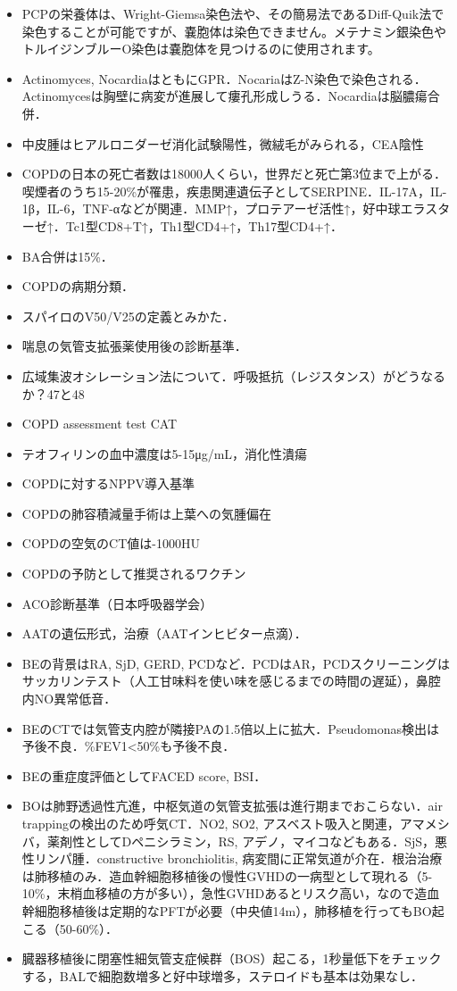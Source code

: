 \begin{itemize}
\item PCPの栄養体は、Wright-Giemsa染色法や、その簡易法であるDiff-Quik法で染色することが可能ですが、嚢胞体は染色できません。メテナミン銀染色やトルイジンブルーO染色は嚢胞体を見つけるのに使用されます。

\item Actinomyces, NocardiaはともにGPR．NocariaはZ-N染色で染色される．Actinomycesは胸壁に病変が進展して瘻孔形成しうる．Nocardiaは脳膿瘍合併．


\item 中皮腫はヒアルロニダーゼ消化試験陽性，微絨毛がみられる，CEA陰性

\item COPDの日本の死亡者数は18000人くらい，世界だと死亡第3位まで上がる．喫煙者のうち15-20\%が罹患，疾患関連遺伝子としてSERPINE．IL-17A，IL-1β，IL-6，TNF-αなどが関連．MMP↑，プロテアーゼ活性↑，好中球エラスターゼ↑．Tc1型CD8+T↑，Th1型CD4+↑，Th17型CD4+↑．
\item BA合併は15\%．
\item COPDの病期分類．
\item スパイロのV50/V25の定義とみかた．
\item 喘息の気管支拡張薬使用後の診断基準．
\item 広域集波オシレーション法について．呼吸抵抗（レジスタンス）がどうなるか？47と48
\item COPD assessment test CAT
\item テオフィリンの血中濃度は5-15μg/mL，消化性潰瘍
\item COPDに対するNPPV導入基準
\item COPDの肺容積減量手術は上葉への気腫偏在
\item COPDの空気のCT値は-1000HU
\item COPDの予防として推奨されるワクチン
\item ACO診断基準（日本呼吸器学会）
\item AATの遺伝形式，治療（AATインヒビター点滴）．
\item BEの背景はRA, SjD, GERD, PCDなど．PCDはAR，PCDスクリーニングはサッカリンテスト（人工甘味料を使い味を感じるまでの時間の遅延），鼻腔内NO異常低音．
\item BEのCTでは気管支内腔が隣接PAの1.5倍以上に拡大．Pseudomonas検出は予後不良．\%FEV1<50\%も予後不良．
\item BEの重症度評価としてFACED score, BSI．
\item BOは肺野透過性亢進，中枢気道の気管支拡張は進行期までおこらない．air trappingの検出のため呼気CT．NO2, SO2, アスベスト吸入と関連，アマメシバ，薬剤性としてDペニシラミン，RS, アデノ，マイコなどもある．SjS，悪性リンパ腫．constructive bronchiolitis, 病変間に正常気道が介在．根治治療は肺移植のみ．造血幹細胞移植後の慢性GVHDの一病型として現れる（5-10\%，末梢血移植の方が多い），急性GVHDあるとリスク高い，なので造血幹細胞移植後は定期的なPFTが必要（中央値14m），肺移植を行ってもBO起こる（50-60\%）．
\item 臓器移植後に閉塞性細気管支症候群（BOS）起こる，1秒量低下をチェックする，BALで細胞数増多と好中球増多，ステロイドも基本は効果なし．


\end{itemize}

